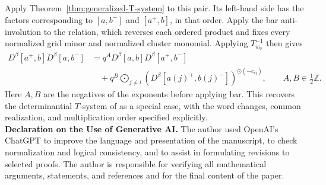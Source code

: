 \documentclass[12pt, reqno]{amsart}
\theoremstyle{plain}
\theoremstyle{definition}
\numberwithin{equation}{section}
\newcommand{\ZZ}{\mathbb{Z}}
\begin{document}
Apply Theorem~\ref{thm:generalized-T-system} to this pair. Its
left-hand side has the factors corresponding to \([a,b^-]\)
and \([a^+,b]\), in that order. Apply the bar anti-involution to
the relation, which reverses each ordered product and fixes every
normalized grid minor and normalized cluster monomial. Applying
\(T_{w_0}^{-1}\) then gives
\begin{equation}\label{eq:determinantial-T-system}
\begin{aligned}
 D^\beta[a^+,b]D^\beta[a,b^-]
  &=q^A D^\beta[a,b]D^\beta[a^+,b^-]\\
  &\quad+q^B
   \bigodot_{j\neq i}
   \left(D^\beta[a(j)^+,b(j)^-]\right)^{\odot(-c_{ij})},
 \qquad A,B\in\tfrac12\ZZ.
\end{aligned}
\end{equation}
Here \(A,B\) are the negatives of the exponents before applying
bar. This recovers the determinantial \(T\)-system of
\cite[Theorems~3.25 and~3.26]{bi2025cluster} as a special case,
with the word changes, common realization, and multiplication
order specified explicitly.\\

\noindent
\textbf{Declaration on the Use of Generative AI.}
The author used OpenAI's ChatGPT to improve the language and
presentation of the manuscript, to check normalization and logical
consistency, and to assist in formulating revisions to selected
proofs. The author is responsible for verifying all mathematical
arguments, statements, and references and for the final content of
the paper.
\end{document}
